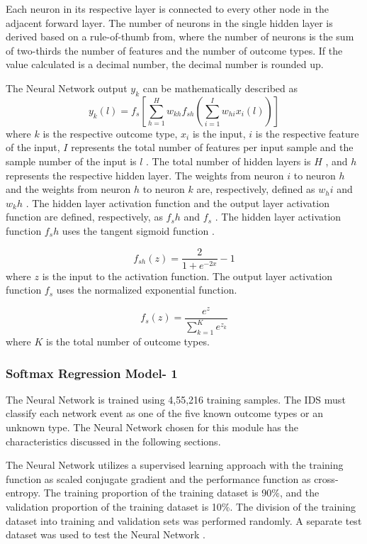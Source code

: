 \documentclass[12pt]{article}
\theoremstyle{definition}
\begin{document}
			Each neuron in its respective layer is connected to every other node in the adjacent forward layer. The number of neurons in the single hidden layer is derived based
			on a rule-of-thumb from, where the number of neurons is the sum of two-thirds the number of features and the number of outcome types. If the value calculated is a decimal number, the decimal number is rounded up.
			
			The Neural Network output $ y_{k}$ can be mathematically described as
			\begin{equation}
				y_k(l) = f_s[\sum_{h=1}^{H} w_{kh} f_{sh}(\sum_{i=1}^{I} w_{hi} x_i(l))]
			\end{equation}
			where $ k $ is the respective outcome type, $ x_i $ is the input, $ i $ is the respective feature of the input, $ I $ represents the total number of features per input sample and the sample number of the input is $ l $ . The total number of hidden layers is $ H $ , and $ h $ represents the respective hidden layer. The weights from neuron $ i $ to neuron $ h $ and the weights from neuron $ h $ to neuron $ k $ are, respectively, defined as $ w_hi $  and $ w_kh $ . The hidden layer activation function and the output layer activation function are defined, respectively, as $ f_sh $ and $ f_s $ . The hidden layer activation function $ f_sh $ uses the tangent sigmoid function  \cite{Ojha2017}.
			
			\begin{equation}
				f_{sh}(z) = \frac{2}{1 + e^{-2x}} - 1
			\end{equation}
			where $ z $ is the input to the activation function. The output layer activation function $ f_s $ uses the normalized exponential function.
			
			\begin{equation}
				f_s(z) = \frac{e^z}{\sum_{k=1}^{K} e^{z_k}}
			\end{equation}
			where $ K $ is the total number of outcome types.
			
			\subsubsection{Softmax Regression Model- 1}
			The Neural Network is trained using 4,55,216 training samples. The IDS must classify each
			network event as one of the five known outcome types or an unknown type. The Neural Network
			chosen for this module has the characteristics discussed in the following sections.
			
			The Neural Network utilizes a supervised learning approach with the training function as
			scaled conjugate gradient and the performance function as cross-entropy. The training
			proportion of the training dataset is 90\%, and the validation proportion of the training
			dataset is 10\%. The division of the training dataset into training and validation sets was
			performed randomly. A separate test dataset was used to test the Neural Network  \cite{Ojha2017}.
			
\end{document}
